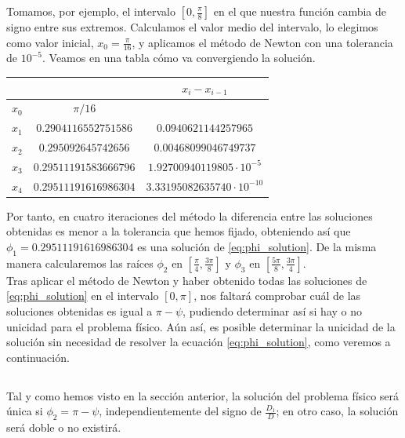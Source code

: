 \documentclass[11pt]{article}
\begin{document}
Tomamos, por ejemplo, el intervalo $[0,\frac{\pi}{8}]$ en el que nuestra función cambia de signo entre sus extremos. Calculamos el valor medio del intervalo, lo elegimos como valor inicial, $x_0=\frac{\pi}{16}$, y aplicamos el método de Newton con una tolerancia de $10^{-5}$. Veamos en una tabla cómo va convergiendo la solución.
\begin{table}[H]
\centering
\def\arraystretch{1.5}
\setlength{\tabcolsep}{20pt}
\begin{tabular}{ccc}
      &                       & $x_i-x_{i-1}$                   \\ \hline
$x_0$ & $\pi/16$              &                                 \\ \hline
$x_1$ & $0.2904116552751586$  & $0.0940621144257965$            \\ \hline
$x_2$ & $0.295092645742656$   & $0.00468099046749737$           \\ \hline
$x_3$ & $0.29511191583666796$ & $1.92700940119805\cdot10^{-5}$  \\ \hline
$x_4$ & $0.29511191616986304$ & $3.33195082635740\cdot10^{-10}$ \\ \hline
\end{tabular}
\end{table}

Por tanto, en cuatro iteraciones del método la diferencia entre las soluciones obtenidas es menor a la tolerancia que hemos fijado, obteniendo así que $\phi_1=0.29511191616986304$ es una solución de \eqref{eq:phi_solution}. De la misma manera calcularemos las raíces $\phi_2$ en $[\frac{\pi}{4},\frac{3\pi}{8}]$ y $\phi_3$ en $[\frac{5\pi}{8},\frac{3\pi}{4}]$.\\

Tras aplicar el método de Newton y haber obtenido todas las soluciones de \eqref{eq:phi_solution} en el intervalo $[0,\pi]$, nos faltará comprobar cuál de las soluciones obtenidas es igual a $\pi-\psi$, pudiendo determinar así si hay o no unicidad para el problema físico. Aún así, es posible determinar la unicidad de la solución sin necesidad de resolver la ecuación \eqref{eq:phi_solution}, como veremos a continuación.\\

\subsection{}
\label{subsec:unicidad}
Tal y como hemos visto en la sección anterior, la solución del problema físico será única si $\phi_2=\pi-\psi$, independientemente del signo de $\frac{D_1}{D}$; en otro caso, la solución será doble o no existirá.\\
\end{document}
